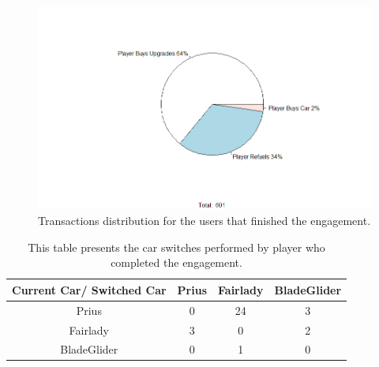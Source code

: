 \documentclass[preprint,authoryear,12pt]{elsarticle}
\begin{document}
\begin{figure}[htb]
	\begin{center}
		\includegraphics[width=.95\linewidth]{ijhcs14-img/Transactions}
		\caption{Transactions distribution for the users that finished the engagement.\label{fig:engagementtransactions}}
	\end{center}
\end{figure}


\begin{table}[!htb]
	\renewcommand*{\arraystretch}{1.4}
	\caption{This table presents the car switches performed by player who completed the engagement.}
	\begin{center}
		\begin{tabular}{c|c|c|c}
			Current Car/ Switched Car & Prius & Fairlady & BladeGlider \\
			\hline
			Prius &	 0
			& 24  & 3  \\
			
			Fairlady & 3
			& 0  &  2 \\
			
			BladeGlider &	 0
			& 1  &  0  \\
		
		\end{tabular}
	\end{center}
	\label{T:Carswitch}
\end{table}
\end{document}
